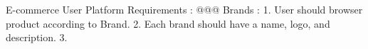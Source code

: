 E-commerce User Platform Requirements :
@@@ Brands : 
    1. User should browser product according to Brand.
    2. Each brand should have a name, logo, and description.
    3. 
   
